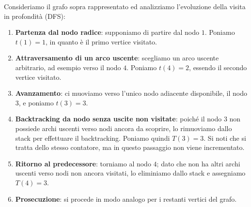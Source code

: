 \documentclass[12pt]{report}
\begin{document}
	\begin{center}
	\end{center}
	
	Consideriamo il grafo sopra rappresentato ed analizziamo l'evoluzione della visita in profondità (DFS):
	\begin{enumerate}
		\item \textbf{Partenza dal nodo radice}: supponiamo di partire dal nodo $1$. Poniamo $t(1) = 1$, in quanto è il primo vertice visitato.
		\item \textbf{Attraversamento di un arco uscente}: scegliamo un arco uscente arbitrario, ad esempio verso il nodo $4$. Poniamo $t(4) = 2$, essendo il secondo vertice visitato.
		\item \textbf{Avanzamento}: ci muoviamo verso l'unico nodo adiacente disponibile, il nodo $3$, e poniamo $t(3) = 3$.
		\item \textbf{Backtracking da nodo senza uscite non visitate}: poiché il nodo $3$ non possiede archi uscenti verso nodi ancora da scoprire, lo rimuoviamo dallo stack per effettuare il backtracking. Poniamo quindi $T(3) = 3$. Si noti che si tratta dello stesso contatore, ma in questo passaggio non viene incrementato.
		\item \textbf{Ritorno al predecessore}: torniamo al nodo $4$; dato che non ha altri archi uscenti verso nodi non ancora visitati, lo eliminiamo dallo stack e assegniamo $T(4) = 3$.
		\item \textbf{Prosecuzione}: si procede in modo analogo per i restanti vertici del grafo.
	\end{enumerate}
	
\end{document}
